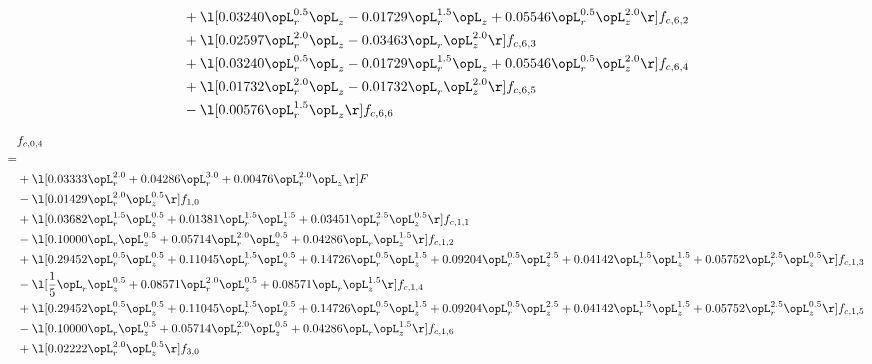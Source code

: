 \begin{alignat}{2}
& + \l[  0.03240 \opL_r^{0.5} \opL_z   -0.01729 \opL_r^{1.5} \opL_z +  0.05546 \opL_r^{0.5} \opL_z^{2.0}  \r] f_{c,6,2} \nonumber \\ 
& + \l[  0.02597 \opL_r^{2.0} \opL_z   -0.03463 \opL_r \opL_z^{2.0}  \r] f_{c,6,3} \nonumber \\ 
& + \l[  0.03240 \opL_r^{0.5} \opL_z   -0.01729 \opL_r^{1.5} \opL_z +  0.05546 \opL_r^{0.5} \opL_z^{2.0}  \r] f_{c,6,4} \nonumber \\ 
& + \l[  0.01732 \opL_r^{2.0} \opL_z   -0.01732 \opL_r \opL_z^{2.0}  \r] f_{c,6,5} \nonumber \\ 
& - \l[  0.00576 \opL_r^{1.5} \opL_z  \r] f_{c,6,6} \nonumber \\ 
\end{alignat} 


\begin{alignat}{2} 
\label{eq:f_04_1} 
& f_{c,0,4} \nonumber \\ 
 = \\ 
& + \l[  0.03333 \opL_r^{2.0} +  0.04286 \opL_r^{3.0} +  0.00476 \opL_r^{2.0} \opL_z  \r] F \nonumber \\ 
& - \l[  0.01429 \opL_r^{2.0} \opL_z^{0.5}  \r] f_{1,0} \nonumber \\ 
& + \l[  0.03682 \opL_r^{1.5} \opL_z^{0.5} +  0.01381 \opL_r^{1.5} \opL_z^{1.5} +  0.03451 \opL_r^{2.5} \opL_z^{0.5}  \r] f_{c,1,1} \nonumber \\ 
& - \l[  0.10000 \opL_r \opL_z^{0.5} +  0.05714 \opL_r^{2.0} \opL_z^{0.5} +  0.04286 \opL_r \opL_z^{1.5}  \r] f_{c,1,2} \nonumber \\ 
& + \l[  0.29452 \opL_r^{0.5} \opL_z^{0.5} +  0.11045 \opL_r^{1.5} \opL_z^{0.5} +  0.14726 \opL_r^{0.5} \opL_z^{1.5} +  0.09204 \opL_r^{0.5} \opL_z^{2.5} +  0.04142 \opL_r^{1.5} \opL_z^{1.5} +  0.05752 \opL_r^{2.5} \opL_z^{0.5}  \r] f_{c,1,3} \nonumber \\ 
& - \l[ \frac{1}{5} \opL_r \opL_z^{0.5} +  0.08571 \opL_r^{2.0} \opL_z^{0.5} +  0.08571 \opL_r \opL_z^{1.5}  \r] f_{c,1,4} \nonumber \\ 
& + \l[  0.29452 \opL_r^{0.5} \opL_z^{0.5} +  0.11045 \opL_r^{1.5} \opL_z^{0.5} +  0.14726 \opL_r^{0.5} \opL_z^{1.5} +  0.09204 \opL_r^{0.5} \opL_z^{2.5} +  0.04142 \opL_r^{1.5} \opL_z^{1.5} +  0.05752 \opL_r^{2.5} \opL_z^{0.5}  \r] f_{c,1,5} \nonumber \\ 
& - \l[  0.10000 \opL_r \opL_z^{0.5} +  0.05714 \opL_r^{2.0} \opL_z^{0.5} +  0.04286 \opL_r \opL_z^{1.5}  \r] f_{c,1,6} \nonumber \\ 
& + \l[  0.02222 \opL_r^{2.0} \opL_z^{0.5}  \r] f_{3,0} \nonumber \\ 

\end{alignat}
